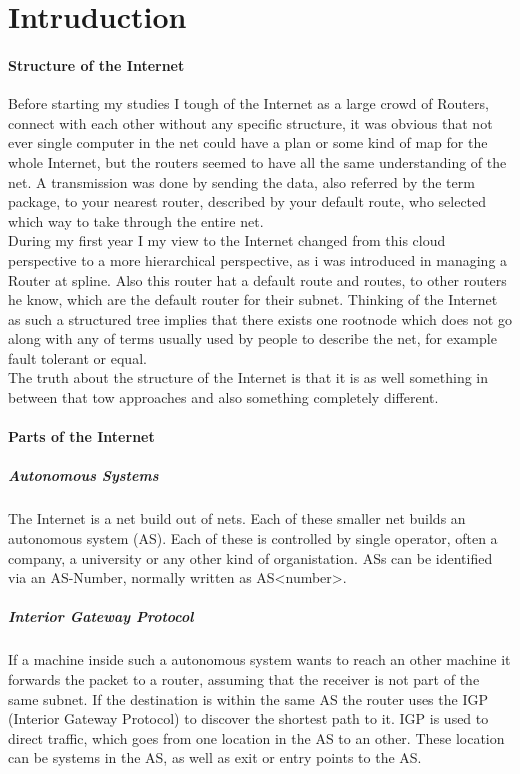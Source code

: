 \section{Intruduction}
\paragraph{Structure of the Internet}
Before starting my studies I tough of the Internet as a large crowd of 
Routers, connect with each other without any specific structure, it was 
obvious that not ever single computer in the net could have a plan or 
some kind of map for the whole Internet, but the routers seemed to have 
all the same understanding of the net. A transmission was done by 
sending the data, also referred by the term package, to your nearest 
router, described by your default route, who selected which way to take 
through the entire net. \\
During my first year I my view to the Internet changed from this 
cloud perspective to a more hierarchical perspective, as i was introduced 
in managing a Router at spline. Also this router hat a default route 
and routes, to other routers he know, which are the default router for 
their subnet. Thinking of the Internet as such a structured tree 
implies that there exists one rootnode which does not go along with any 
of terms usually used by people to describe the net, for example 
fault tolerant or equal. \\
The truth about the structure of the Internet is that it is as well 
something in between that tow approaches and also something completely 
different. 
\paragraph{Parts of the Internet}
\subparagraph{Autonomous Systems}
The Internet is a net build out of nets. Each of these smaller net 
builds an autonomous system (AS). Each of these is controlled by single 
operator, often a company, a university or any other kind of 
organistation. ASs can be identified via an AS-Number, normally written 
as AS<number>.
\subparagraph{Interior Gateway Protocol}
If a machine inside such a autonomous system wants to reach an other 
machine it forwards the packet to a router, assuming that the receiver 
is not part of the same subnet. If the destination is within the same AS 
the router uses the IGP (Interior Gateway Protocol) to discover the 
shortest path to it. IGP is used to direct traffic, which goes from 
one location in the AS to an other. These location can be systems in 
the AS, as well as exit or entry points to the AS.
